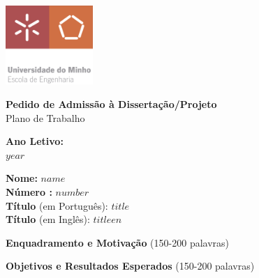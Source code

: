 \documentclass[a4paper, 12pt]{article}
\begin{document}
   
\begin{textbox}[halign=center, valign=center, fit to height=3cm, width=0.2\textwidth, after=, frame hidden, boxrule=-1pt]
    \begin{minipage}[t]{\linewidth}
    \vspace*{0pt}
        \includegraphics[height=3cm,width=\linewidth, keepaspectratio]{logo.png}
    \end{minipage}
\end{textbox}
\negthickspace
\begin{textbox}[halign=center, valign=center, fit to height=3cm, width=0.8\textwidth, before=, frame hidden, boxrule=-1pt]
    \large\textbf{Pedido de Admissão à Dissertação/Projeto} \\
    Plano de Trabalho 
\end{textbox}
    
\begin{textbox}[halign=center, valign=center, fit to height=3cm, width=0.2\textwidth, after=]
    \textbf{Ano Letivo:} \\
    $year$
\end{textbox}
\negthickspace
\begin{textbox}[valign=center, fit to height=3cm, width=0.8\textwidth, before=]
    \small{\textbf{Nome:}} $name$ \\
    \small{\textbf{Número :}} $number$\\
    \textbf{Título} \small(em Português): $title$ \\
    \textbf{Título} \small(em Inglês): $titleen$
\end{textbox}


\begin{textbox}
\small{\textbf{Enquadramento e Motivação}} \tiny{(150-200 palavras)} \small

\end{textbox}

\begin{textbox}
\small{\textbf{Objetivos e Resultados Esperados}} \tiny{(150-200 palavras)} \small

\end{textbox}
\end{document}
